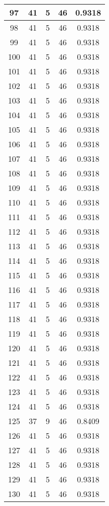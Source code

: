 \documentclass[letterpaper, 12pt]{article}
\begin{document}
\begin{longtable}{|c|c|c|c|c|}
\hline
97 & 41 & 5 & 46 & 0.9318 \\
\hline
98 & 41 & 5 & 46 & 0.9318 \\
\hline
99 & 41 & 5 & 46 & 0.9318 \\
\hline
100 & 41 & 5 & 46 & 0.9318 \\
\hline
101 & 41 & 5 & 46 & 0.9318 \\
\hline
102 & 41 & 5 & 46 & 0.9318 \\
\hline
103 & 41 & 5 & 46 & 0.9318 \\
\hline
104 & 41 & 5 & 46 & 0.9318 \\
\hline
105 & 41 & 5 & 46 & 0.9318 \\
\hline
106 & 41 & 5 & 46 & 0.9318 \\
\hline
107 & 41 & 5 & 46 & 0.9318 \\
\hline
108 & 41 & 5 & 46 & 0.9318 \\
\hline
109 & 41 & 5 & 46 & 0.9318 \\
\hline
110 & 41 & 5 & 46 & 0.9318 \\
\hline
111 & 41 & 5 & 46 & 0.9318 \\
\hline
112 & 41 & 5 & 46 & 0.9318 \\
\hline
113 & 41 & 5 & 46 & 0.9318 \\
\hline
114 & 41 & 5 & 46 & 0.9318 \\
\hline
115 & 41 & 5 & 46 & 0.9318 \\
\hline
116 & 41 & 5 & 46 & 0.9318 \\
\hline
117 & 41 & 5 & 46 & 0.9318 \\
\hline
118 & 41 & 5 & 46 & 0.9318 \\
\hline
119 & 41 & 5 & 46 & 0.9318 \\
\hline
120 & 41 & 5 & 46 & 0.9318 \\
\hline
121 & 41 & 5 & 46 & 0.9318 \\
\hline
122 & 41 & 5 & 46 & 0.9318 \\
\hline
123 & 41 & 5 & 46 & 0.9318 \\
\hline
124 & 41 & 5 & 46 & 0.9318 \\
\hline
125 & 37 & 9 & 46 & 0.8409 \\
\hline
126 & 41 & 5 & 46 & 0.9318 \\
\hline
127 & 41 & 5 & 46 & 0.9318 \\
\hline
128 & 41 & 5 & 46 & 0.9318 \\
\hline
129 & 41 & 5 & 46 & 0.9318 \\
\hline
130 & 41 & 5 & 46 & 0.9318 \\

\end{longtable}
\end{document}

